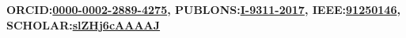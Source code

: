 \documentclass[mm,10pt,a4paper]{simple_style}
\newcommand{\MyLinks}{\noindent
\textbf{ORCID:\href{http://orcid.org/0000-0002-2889-4275}{0000-0002-2889-4275}, \hfill
PUBLONS:\href{https://publons.com/researcher/I-9311-2017}{I-9311-2017}, \hfill
IEEE:\href{https://ieeexplore.ieee.org/author/37086581106}{91250146}, \hfill
SCHOLAR:\href{https://scholar.google.co.in/citations?user=slZHj6cAAAAJ}{slZHj6cAAAAJ}\ }}
\begin{document}
\begin{resume}
\fullline
\small{\hspace*{-10.2em}\MyLinks} \\
\vspace{-1em}
\sectionline

%











\end{resume}
\nocite{*}
\end{document}
